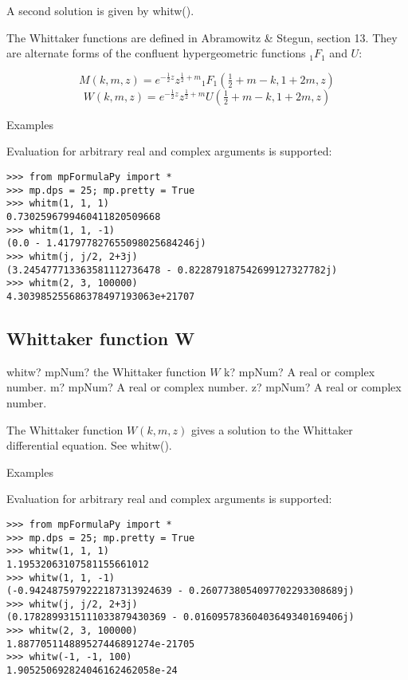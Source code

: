 A second solution is given by whitw().

The Whittaker functions are defined in Abramowitz \& Stegun, section 13.
They are alternate forms of the confluent hypergeometric functions ${}_1F_1$ and $U$:

\begin{equation}
M(k, m, z) = e^{-\frac{1}{2}z} z^{\frac{1}{2}+m} {}_1F_1\left(\tfrac{1}{2}+m-k, 1+2m, z \right)
\end{equation}
\begin{equation}
W(k, m, z) = e^{-\frac{1}{2}z} z^{\frac{1}{2}+m} U\left(\tfrac{1}{2}+m-k, 1+2m, z \right)
\end{equation}

Examples

Evaluation for arbitrary real and complex arguments is supported:

\begin{lstlisting}
>>> from mpFormulaPy import *
>>> mp.dps = 25; mp.pretty = True
>>> whitm(1, 1, 1)
0.7302596799460411820509668
>>> whitm(1, 1, -1)
(0.0 - 1.417977827655098025684246j)
>>> whitm(j, j/2, 2+3j)
(3.245477713363581112736478 - 0.822879187542699127327782j)
>>> whitm(2, 3, 100000)
4.303985255686378497193063e+21707
\end{lstlisting}



\subsection{Whittaker function W}

\begin{mpFunctionsExtract}
	\mpFunctionThree
	{whitw? mpNum? the Whittaker function $W$}
	{k? mpNum? A real or complex number.}
	{m? mpNum? A real or complex number.}
	{z? mpNum? A real or complex number.}		
\end{mpFunctionsExtract}

\vpara
The Whittaker function $W(k, m, z)$ gives a solution to the Whittaker differential equation. See whitw().

Examples

Evaluation for arbitrary real and complex arguments is supported:

\begin{lstlisting}
>>> from mpFormulaPy import *
>>> mp.dps = 25; mp.pretty = True
>>> whitw(1, 1, 1)
1.19532063107581155661012
>>> whitw(1, 1, -1)
(-0.9424875979222187313924639 - 0.2607738054097702293308689j)
>>> whitw(j, j/2, 2+3j)
(0.1782899315111033879430369 - 0.01609578360403649340169406j)
>>> whitw(2, 3, 100000)
1.887705114889527446891274e-21705
>>> whitw(-1, -1, 100)
1.905250692824046162462058e-24
\end{lstlisting}







